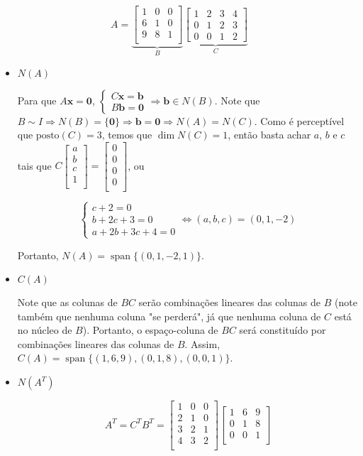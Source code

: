 \documentclass[leqno]{article}
\newcommand{\ezvecqua}[4]{\begin{bmatrix}
#1\\
#2\\
#3\\
#4\\
\end{bmatrix}}
\DeclareMathOperator{\spn}{span}
\newcommand{\pst}[1]{\text{posto}(#1)}
\begin{document}
\begin{enumerate}
    $$A=\underbrace{\begin{bmatrix}
    1 & 0 & 0\\
    6 & 1 & 0\\
    9 & 8 & 1\\
    \end{bmatrix}}_{B}\underbrace{\begin{bmatrix}
    1 & 2 & 3 & 4\\
    0 & 1 & 2 & 3\\
    0 & 0 & 1 & 2
    \end{bmatrix}}_{C}$$

    \begin{itemize}
        \item $N(A)$
        
        Para que $A\textbf{x}=\textbf{0}$, $\begin{cases}C\textbf{x}=\textbf{b}\\B\textbf{b}=\textbf{0}\end{cases}\Rightarrow\textbf{b}\in N(B)$. Note que $B\sim I\Rightarrow N(B)=\{\textbf{0}\}\Rightarrow\textbf{b}=\textbf{0}\Rightarrow N(A)=N(C)$. Como é perceptível que $\pst{C}=3$, temos que $\dim N(C)=1$, então basta achar $a$, $b$ e $c$ tais que $C\ezvecqua{a}{b}{c}{1}=\ezvecqua{0}{0}{0}{0}$, ou
        
        $$\begin{cases}c+2=0\\b+2c+3=0\\a+2b+3c+4=0\end{cases}\iff(a,b,c)=(0,1,-2)$$
        
        Portanto, $N(A)=\spn\{(0,1,-2,1)\}$.
        
        \item $C(A)$
        
        Note que as colunas de $BC$ serão combinações lineares das colunas de $B$ (note também que nenhuma coluna "se perderá", já que nenhuma coluna de $C$ está no núcleo de $B$). Portanto, o espaço-coluna de $BC$ será constituído por combinações lineares das colunas de $B$. Assim, $C(A)=\spn\{(1,6,9),(0,1,8),(0,0,1)\}$.
        
        \item $N(A^T)$
        
        $$A^T=C^TB^T=\begin{bmatrix}
        1 & 0 & 0\\
        2 & 1 & 0\\
        3 & 2 & 1\\
        4 & 3 & 2\\
        \end{bmatrix}\begin{bmatrix}
        1 & 6 & 9\\
        0 & 1 & 8\\
        0 & 0 & 1\\
        \end{bmatrix}$$
        

\end{itemize}
\end{enumerate}
\end{document}
